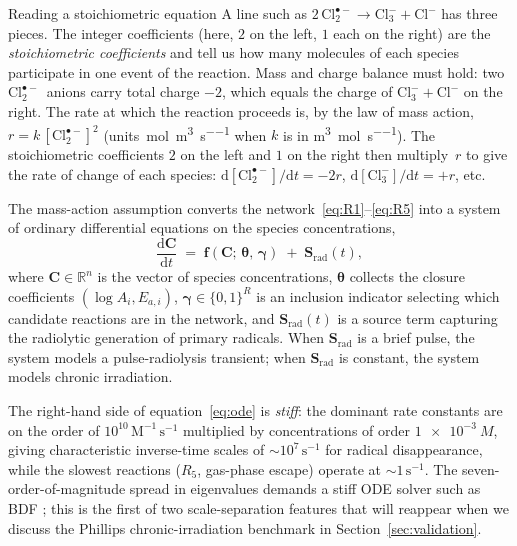 \documentclass[12pt]{article}
\theoremstyle{plain}
\theoremstyle{definition}
\theoremstyle{remark}
\newcommand{\Clt}{\ensuremath{\mathrm{Cl}_2^{\bullet-}}\xspace}
\renewcommand{\d}{\mathrm{d}}
\newcommand{\R}{\mathbb{R}}
\begin{document}
\begin{tutorialbox}{Reading a stoichiometric equation}
A line such as $2\,\Clt \to \mathrm{Cl}_3^- + \mathrm{Cl}^-$ has three pieces.
The integer coefficients (here, $2$ on the left, $1$ each on the right) are
the \emph{stoichiometric coefficients} and tell us how many molecules of each
species participate in one event of the reaction.  Mass and charge balance
must hold: two \Clt\ anions carry total charge $-2$, which equals the charge
of $\mathrm{Cl}_3^- + \mathrm{Cl}^-$ on the right.  The rate at which the
reaction proceeds is, by the law of mass action,
$r = k\,[\Clt]^2$ (units~\si{mol\per m^3\per s} when $k$ is in
\si{m^3\per mol\per s}).  The stoichiometric coefficients $2$ on the left and
$1$ on the right then multiply~$r$ to give the rate of change of each species:
$\d[\Clt]/\d t = -2r$, $\d[\mathrm{Cl}_3^-]/\d t = +r$, etc.
\end{tutorialbox}

The mass-action assumption converts the network~\eqref{eq:R1}--\eqref{eq:R5}
into a system of ordinary differential equations on the species
concentrations,
%
\begin{equation}
  \frac{\d \mathbf{C}}{\d t} \;=\; \mathbf{f}(\mathbf{C};\,\boldsymbol{\theta},\,\boldsymbol\gamma)
  \;+\; \mathbf{S}_{\mathrm{rad}}(t),
  \label{eq:ode}
\end{equation}
%
where $\mathbf{C}\in\R^{n}$ is the vector of species concentrations,
$\boldsymbol{\theta}$ collects the closure coefficients $(\log A_i, E_{a,i})$,
$\boldsymbol\gamma\in\{0,1\}^R$ is an inclusion indicator selecting which
candidate reactions are in the network, and $\mathbf{S}_{\mathrm{rad}}(t)$ is a
source term capturing the radiolytic generation of primary radicals.  When
$\mathbf{S}_{\mathrm{rad}}$ is a brief pulse, the system models a
pulse-radiolysis transient; when $\mathbf{S}_{\mathrm{rad}}$ is constant, the
system models chronic irradiation.

The right-hand side of equation~\eqref{eq:ode} is \emph{stiff}:  the dominant
rate constants are on the order of $10^{10}\,\mathrm{M}^{-1}\,\mathrm{s}^{-1}$
multiplied by concentrations of order $\SI{1e-3}{M}$, giving characteristic
inverse-time scales of $\sim 10^7\,\mathrm{s}^{-1}$ for radical disappearance,
while the slowest reactions ($R_5$, gas-phase escape) operate at
$\sim 1\,\mathrm{s}^{-1}$.  The seven-order-of-magnitude spread in eigenvalues
demands a stiff ODE solver such as BDF \citep{Hindmarsh2005}; this is the first
of two scale-separation features that will reappear when we discuss the
Phillips chronic-irradiation benchmark in Section~\ref{sec:validation}.
\end{document}
